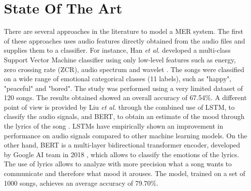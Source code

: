 \documentclass[runningheads]{llncs}
\begin{document}
\section{State Of The Art}

There are several approaches in the literature to model a MER system. The first of these approaches uses audio features directly obtained from the audio files and supplies them to a classifier. For instance, Han \textit{et al.} developed a multi-class Support Vector Machine classifier using only low-level features such as energy, zero crossing rate (ZCR), audio spectrum and wavelet \cite{han2010music}. The songs were classified on a wide range of emotional categorical classes (11 labels), such as "happy", "peaceful" and "bored". The study was performed using a very limited dataset of 120 songs. The results obtained showed an overall accuracy of 67.54\%.
A different point of view is provided by Liu \textit{et al.} through the combined use of LSTM, to classify the audio signals, and BERT, to obtain an estimate of the mood through the lyrics of the song \cite{liu2020research}. 
LSTMs have empirically shown an improvement in performance on audio signals compared to other machine learning models. On the other hand, BERT is a multi-layer bidirectional transformer encoder, developed by Google AI team in 2018 \cite{devlin2018bert}, which allows to classify the emotions of the lyrics. The use of lyrics allows to analyze with more precision what a song wants to communicate and therefore what mood it arouses. The model, trained on a set of 1000 songs, achieves an average accuracy of 79.70\%.

\end{document}
